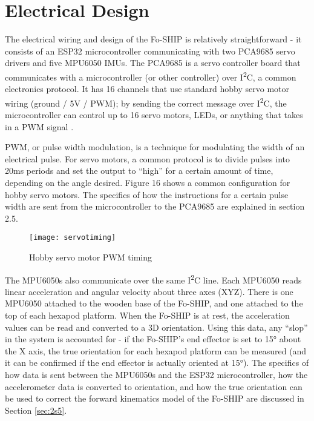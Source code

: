 \documentclass[12pt,a4paper]{report}
\begin{document}
\vspace{10pt}
\section{Electrical Design} \label{sec:2s3}
The electrical wiring and design of the Fo-SHIP is relatively straightforward - it consists of an ESP32 microcontroller communicating with two PCA9685 servo drivers and five MPU6050 IMUs. The PCA9685 is a servo controller board that communicates with a microcontroller (or other controller) over I\textsuperscript{2}C, a common electronics protocol. It has 16 channels that use standard hobby servo motor wiring (ground / 5V / PWM); by sending the correct message over I\textsuperscript{2}C, the microcontroller can control up to 16 servo motors, LEDs, or anything that takes in a PWM signal \cite{pca9685datasheet}.

PWM, or pulse width modulation, is a technique for modulating the width of an electrical pulse. For servo motors, a common protocol is to divide pulses into 20ms periods and set the output to “high” for a certain amount of time, depending on the angle desired. Figure 16 shows a common configuration for hobby servo motors. The specifics of how the instructions for a certain pulse width are sent from the microcontroller to the PCA9685 are explained in section 2.5.

\begin{figure}[htbp]
	\centering
	\texttt{[image: servotiming]}
	\caption{Hobby servo motor PWM timing \cite{servos}}
	\label{fig:servotiming}
\end{figure}

The MPU6050s also communicate over the same I\textsuperscript{2}C line. Each MPU6050 reads linear acceleration and angular velocity about three axes (XYZ). There is one MPU6050 attached to the wooden base of the Fo-SHIP, and one attached to the top of each hexapod platform. When the Fo-SHIP is at rest, the acceleration values can be read and converted to a 3D orientation. Using this data, any “slop” in the system is accounted for - if the Fo-SHIP’s end effector is set to 15° about the X axis, the true orientation for each hexapod platform can be measured (and it can be confirmed if the end effector is actually oriented at 15°). The specifics of how data is sent between the MPU6050s and the ESP32 microcontroller, how the accelerometer data is converted to orientation, and how the true orientation can be used to correct the forward kinematics model of the Fo-SHIP are discussed in Section \ref{sec:2s5}. 
\end{document}
